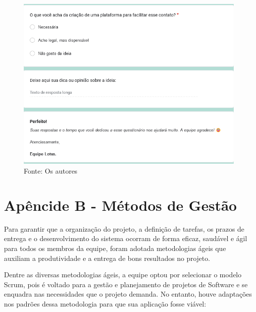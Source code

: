 \documentclass[12pt,a4paper]{article}
\begin{document}
\begin{figure}[H]
    \centering
     \includegraphics[width=15cm]{foto4.png}
     Fonte: Os autores
     \label{fig06}
\end{figure}

\newpage

\section{Apêncide B - Métodos de Gestão}
Para garantir que a organização do projeto, a definição de tarefas, os prazos de entrega e o desenvolvimento do sistema ocorram de forma eficaz, saudável e ágil para todos os membros da equipe, foram adotada metodologias ágeis que auxiliam a produtividade e a entrega de bons resultados no projeto.

Dentre as diversas metodologias ágeis, a equipe optou por selecionar o modelo \gls{Scrum}, pois é voltado para a gestão e planejamento de projetos de \gls{Software} e se enquadra nas necessidades que o projeto demanda. No entanto, houve adaptações nos padrões dessa metodologia para que sua aplicação fosse viável:
\end{document}
